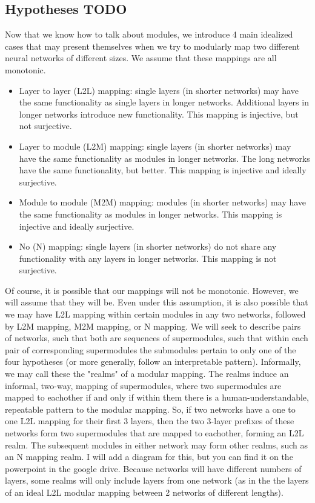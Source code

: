 \documentclass{article} %
\begin{document}
\subsection{Hypotheses TODO}
Now that we know how to talk about modules, we introduce 4 main idealized cases that may present themselves when we
try to modularly map two different neural networks of different sizes. We assume that these mappings are all monotonic.
\begin{itemize}
   \item Layer to layer (L2L) mapping: single layers (in shorter networks) may have the same functionality as single layers in longer networks. Additional layers in longer networks introduce new functionality. This mapping is injective, but not surjective.
   \item Layer to module (L2M) mapping: single layers (in shorter networks) may have the same functionality as modules in longer networks. The long networks have the same functionality, but better. This mapping is injective and ideally surjective.
   \item Module to module (M2M) mapping: modules (in shorter networks) may have the same functionality as modules in longer networks. This mapping is injective and ideally surjective.
   \item No (N) mapping: single layers (in shorter networks) do not share any functionality with any layers in longer networks. This mapping is not surjective.
\end{itemize}

Of course, it is possible that our mappings will not be monotonic. However, we will assume that they will be. Even under this assumption, it is also possible that we may have L2L 
mapping within certain modules in any two networks, followed by L2M mapping, M2M mapping, or N mapping. We will seek to describe pairs of networks, such that both are sequences of supermodules,
such that within each pair of corresponding supermodules the submodules pertain to only one of the four hypotheses (or more generally, follow an interpretable pattern).
Informally, we may call these the "realms" of a modular mapping. The realms induce an informal, two-way, mapping of supermodules, where two supermodules are mapped to eachother if and only if
within them there is a human-understandable, repeatable pattern to the modular mapping. So, if two networks have a one to one L2L mapping for their first 3 layers, then the two 3-layer prefixes of
these networks form two supermodules that are mapped to eachother, forming an L2L realm. The subsequent modules in either network may form other realms, such as an N mapping realm. I will add a
diagram for this, but you can find it on the powerpoint in the google drive. Because networks will have different numbers of layers, some realms will only include layers from one network (as in the
the layers of an ideal L2L modular mapping between 2 networks of different lengths).
\end{document}

